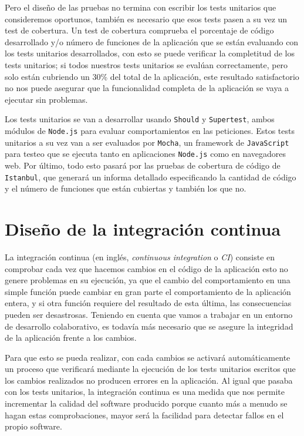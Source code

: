 Pero el diseño de las pruebas no termina con escribir los tests unitarios que consideremos oportunos, también es necesario que esos tests pasen a su vez un test de cobertura. Un test de cobertura comprueba el porcentaje de código desarrollado y/o número de funciones de la aplicación que se están evaluando con los tests unitarios desarrollados, con esto se puede verificar la completitud de los tests unitarios; si todos nuestros tests unitarios se evalúan correctamente, pero solo están cubriendo un 30\% del total de la aplicación, este resultado satisfactorio no nos puede asegurar que la funcionalidad completa de la aplicación se vaya a ejecutar sin problemas.

\bigskip
Los tests unitarios se van a desarrollar usando {\tt Should} y {\tt Supertest}, ambos módulos de {\tt Node.js} para evaluar comportamientos en las peticiones. Estos tests unitarios a su vez van a ser evaluados por {\tt Mocha}, un framework de {\tt JavaScript} para testeo que se ejecuta tanto en aplicaciones {\tt Node.js} como en navegadores web. Por último, todo esto pasará por las pruebas de cobertura de código de {\tt Istanbul}, que generará un informa detallado especificando la cantidad de código y el número de funciones que están cubiertas y también los que no.

\section{Diseño de la integración continua}

La integración continua (en inglés, \textit{continuous integration} o \textit{CI}) consiste en comprobar cada vez que hacemos cambios en el código de la aplicación esto no genere problemas en su ejecución, ya que el cambio del comportamiento en una simple función puede cambiar en gran parte el comportamiento de la aplicación entera, y si otra función requiere del resultado de esta última, las consecuencias pueden ser desastrosas. Teniendo en cuenta que vamos a trabajar en un entorno de desarrollo colaborativo, es todavía más necesario que se asegure la integridad de la aplicación frente a los cambios.

\bigskip
Para que esto se pueda realizar, con cada cambios se activará automáticamente un proceso que verificará mediante la ejecución de los tests unitarios escritos que los cambios realizados no producen errores en la aplicación. Al igual que pasaba con los tests unitarios, la integración continua es una medida que nos permite incrementar la calidad del software producido porque cuanto más a menudo se hagan estas comprobaciones, mayor será la facilidad para detectar fallos en el propio software.

